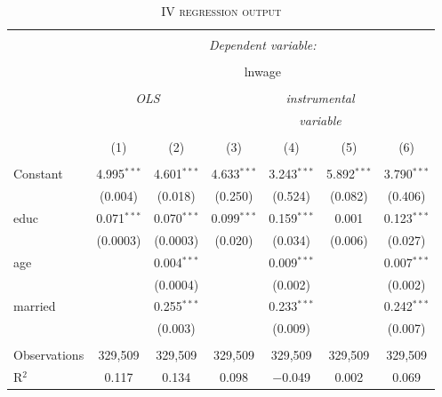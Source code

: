 \documentclass[a4paper]{article}
\begin{document}
\begin{table}[!htbp] \centering 
\begin{adjustwidth}{0.cm}{-0cm}
\begin{threeparttable}
\small
\captionsetup{font=small, justification=raggedright,singlelinecheck=false}
\caption{\textsc{IV regression output}}
\centering 
  \label{}
\small 
\begin{tabular}{@{\extracolsep{-2pt}}lcccccc} 
\\[-5.8ex]\hline 
\hline \\[-1.8ex] 
 & \multicolumn{6}{c}{\textit{Dependent variable:}} \\ 
\cline{2-7} 
\\[-1.8ex] & \multicolumn{6}{c}{lnwage} \\ 
\\[-1.8ex] & \multicolumn{2}{c}{\textit{OLS}} & \multicolumn{4}{c}{\textit{instrumental}} \\ 
 & \multicolumn{2}{c}{\textit{}} & \multicolumn{4}{c}{\textit{variable}} \\ 
\\[-1.8ex] & (1) & (2) & (3) & (4) & (5) & (6)\\ 
\hline \\[-1.8ex] 
 Constant & 4.995$^{***}$ & 4.601$^{***}$ & 4.633$^{***}$ & 3.243$^{***}$ & 5.892$^{***}$ & 3.790$^{***}$ \\ 
  & (0.004) & (0.018) & (0.250) & (0.524) & (0.082) & (0.406) \\ 
  educ & 0.071$^{***}$ & 0.070$^{***}$ & 0.099$^{***}$ & 0.159$^{***}$ & 0.001 & 0.123$^{***}$ \\ 
  & (0.0003) & (0.0003) & (0.020) & (0.034) & (0.006) & (0.027) \\ 
  age &  & 0.004$^{***}$ &  & 0.009$^{***}$ &  & 0.007$^{***}$ \\ 
  &  & (0.0004) &  & (0.002) &  & (0.002) \\ 
  married &  & 0.255$^{***}$ &  & 0.233$^{***}$ &  & 0.242$^{***}$ \\ 
  &  & (0.003) &  & (0.009) &  & (0.007) \\ 
 \hline \\[-1.8ex] 
Observations & 329,509 & 329,509 & 329,509 & 329,509 & 329,509 & 329,509 \\ 
R$^{2}$ & 0.117 & 0.134 & 0.098 & $-$0.049 & 0.002 & 0.069 \\ 

\end{tabular}
\end{threeparttable}
\end{adjustwidth}
\end{table}
\end{document}

